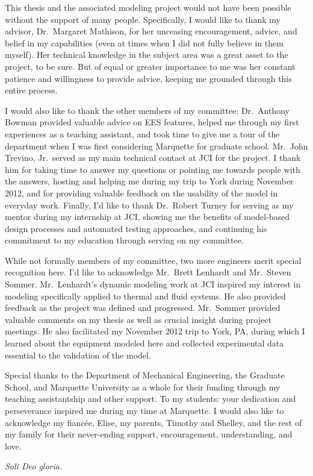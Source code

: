 \begin{acknowledgments}
  This thesis and the associated modeling project 
  would not have been possible without the support of many people. 
  Specifically, I would like to thank my advisor, Dr.~Margaret Mathison,
  for her unceasing encouragement, advice, and belief in my capabilities 
  (even at times when I did not fully believe in them myself). 
  Her technical knowledge in the subject area was a 
  great asset to the project, to be sure.
  But of equal or greater importance to me was her constant patience 
  and willingness to provide advice, keeping me grounded through this entire process.
  
  I would also like to thank the other members of my committee:
  Dr.~Anthony Bowman provided valuable advice on EES features,
  helped me through my first experiences as a teaching assistant, 
  and took time to give me a tour of the department when I was 
  first considering Marquette for graduate school.
  Mr.~John Trevino, Jr.~served as my main technical contact at JCI
  for the project. I thank him for taking time to answer my questions
  or pointing me towards people with the answers, hosting and helping
  me during my trip to York during November 2012, and for providing
  valuable feedback on the usability of the model in everyday work.
  Finally, I'd like to thank Dr.~Robert Turney for serving as my mentor
  during my internship at JCI, showing me the benefits of model-based
  design processes and automated testing approaches, and continuing
  his commitment to my education through serving on my committee.
  
  While not formally members of my committee, two more 
  engineers merit special recognition here. 
  I'd like to acknowledge Mr.~Brett Lenhardt and Mr.~Steven Sommer.
  Mr.~Lenhardt's dynamic modeling work at JCI inspired my interest
  in modeling specifically applied to thermal and fluid systems.
  He also provided feedback as the project was defined and progressed.
  Mr.~Sommer provided valuable comments on my thesis as well as crucial
  insight during project meetings. He also facilitated my November 2012 trip
  to York, PA, during which I learned about the equipment modeled here
  and collected experimental data essential to the validation of the model.

  Special thanks to the Department of Mechanical Engineering, the Graduate School, 
  and Marquette University as a whole for their funding through my teaching
  assistantship and other support. 
  To my students: your dedication and perseverance inspired me during my time
  at Marquette. 
  I would also like to acknowledge my fianc\'ee, Elise, 
  my parents, Timothy and Shelley, and the rest of my family for their 
  never-ending support, encouragement, understanding, and love.

  \vfill \centering
    \emph{Soli Deo gloria.}
  \vfill
\end{acknowledgments}
